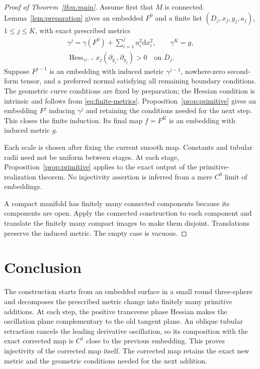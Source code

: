 \documentclass[11pt,a4paper]{article}
\newcommand{\dd}{\mathrm d}
\newcommand{\Hess}{\operatorname{Hess}}
\theoremstyle{definition}
\theoremstyle{remark}
\numberwithin{equation}{section}
\begin{document}
\begin{proof}[Proof of Theorem~\ref{thm:main}]
Assume first that $M$ is connected. Lemma~\ref{lem:preparation} gives
an embedded $F^0$ and a finite list $(D_j,x_j,y_j,a_j)$, $1\le j\le K$,
with exact prescribed metrics
\begin{equation}
 \begin{gathered}
 \gamma^j=\gamma(F^0)+\sum_{i=1}^j a_i^2\dd x_i^2,
 \qquad \gamma^K=g,\\
 \Hess_{\gamma^{j-1}}x_j(\partial_{y_j},\partial_{y_j})>0
 \quad\text{on }\overline D_j.
 \end{gathered}
 \label{eq:finite-metrics}
\end{equation}
Suppose $F^{j-1}$ is an embedding with induced metric $\gamma^{j-1}$,
nowhere-zero second-form tensor, and a preferred normal satisfying all
remaining boundary conditions. The geometric curve conditions are fixed
by preparation; the Hessian condition is intrinsic and follows from
\eqref{eq:finite-metrics}. Proposition~\ref{prop:primitive} gives an
embedding $F^j$ inducing $\gamma^j$ and retaining the conditions needed
for the next step. This closes the finite induction. Its final map
$f=F^K$ is an embedding with induced metric $g$.

Each scale is chosen after fixing the current smooth map. Constants
and tubular radii need not be uniform between stages. At each stage,
Proposition~\ref{prop:primitive} applies to the exact output of the
primitive-realization theorem. No
injectivity assertion is inferred from a mere $C^0$ limit of embeddings.

A compact manifold has finitely many connected components because
its components are open. Apply the connected construction to each
component and translate the finitely many compact images to make them
disjoint. Translations preserve the induced metric. The empty case is
vacuous.
\end{proof}

\section{Conclusion}
\label{sec:conclusion}

The construction starts from an embedded surface in a small round
three-sphere and decomposes the prescribed metric change into finitely many
primitive additions. At each step, the positive transverse phase Hessian
makes the oscillation plane complementary to the old tangent plane.
An oblique tubular retraction cancels the leading derivative oscillation,
so its composition with the exact corrected map is $C^1$ close to the
previous embedding. This proves injectivity of the corrected map itself.
The corrected map retains the exact new metric and the geometric
conditions needed for the next addition.
\end{document}
